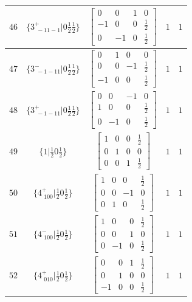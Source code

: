 \documentclass[fleqn,8pt]{jsarticle}
\begin{document}
\begin{longtable}{ccccc}
$ 46 $ & $ \{3^{+}_{\,\,-11-1}|0 \frac{1}{2} \frac{1}{2}\} $ & $ \begin{bmatrix} 0 & 0 & 1 & 0 \\ -1 & 0 & 0 & \frac{1}{2} \\ 0 & -1 & 0 & \frac{1}{2} \end{bmatrix} $ & $ 1 $ & $ 1 $ \\ \hline
$ 47 $ & $ \{3^{-}_{\,\,-1-11}|0 \frac{1}{2} \frac{1}{2}\} $ & $ \begin{bmatrix} 0 & 1 & 0 & 0 \\ 0 & 0 & -1 & \frac{1}{2} \\ -1 & 0 & 0 & \frac{1}{2} \end{bmatrix} $ & $ 1 $ & $ 1 $ \\ \hline
$ 48 $ & $ \{3^{+}_{\,\,-1-11}|0 \frac{1}{2} \frac{1}{2}\} $ & $ \begin{bmatrix} 0 & 0 & -1 & 0 \\ 1 & 0 & 0 & \frac{1}{2} \\ 0 & -1 & 0 & \frac{1}{2} \end{bmatrix} $ & $ 1 $ & $ 1 $ \\ \hline
$ 49 $ & $ \{1|\frac{1}{2} 0 \frac{1}{2}\} $ & $ \begin{bmatrix} 1 & 0 & 0 & \frac{1}{2} \\ 0 & 1 & 0 & 0 \\ 0 & 0 & 1 & \frac{1}{2} \end{bmatrix} $ & $ 1 $ & $ 1 $ \\ \hline
$ 50 $ & $ \{4^{+}_{\,\,100}|\frac{1}{2} 0 \frac{1}{2}\} $ & $ \begin{bmatrix} 1 & 0 & 0 & \frac{1}{2} \\ 0 & 0 & -1 & 0 \\ 0 & 1 & 0 & \frac{1}{2} \end{bmatrix} $ & $ 1 $ & $ 1 $ \\ \hline
$ 51 $ & $ \{4^{-}_{\,\,100}|\frac{1}{2} 0 \frac{1}{2}\} $ & $ \begin{bmatrix} 1 & 0 & 0 & \frac{1}{2} \\ 0 & 0 & 1 & 0 \\ 0 & -1 & 0 & \frac{1}{2} \end{bmatrix} $ & $ 1 $ & $ 1 $ \\ \hline
$ 52 $ & $ \{4^{+}_{\,\,010}|\frac{1}{2} 0 \frac{1}{2}\} $ & $ \begin{bmatrix} 0 & 0 & 1 & \frac{1}{2} \\ 0 & 1 & 0 & 0 \\ -1 & 0 & 0 & \frac{1}{2} \end{bmatrix} $ & $ 1 $ & $ 1 $ \\ \hline

\end{longtable}
\end{document}
